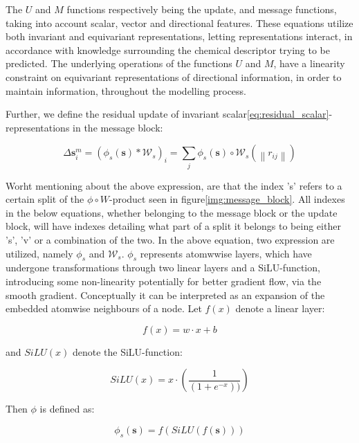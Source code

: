 The $U$ and $M$ functions respectively being the update, and message functions, taking into account scalar, vector and
directional features. These equations utilize both invariant and equivariant representations, letting
representations interact, in accordance with knowledge surrounding the chemical descriptor trying to be predicted. The underlying
operations of the functions $U$ and $M$, have a linearity constraint on equivariant representations of directional information,
in order to maintain
information, throughout the modelling process\cite{Atz2021}.

Further, we define the residual update of invariant scalar\ref{eq:residual_scalar}-representations in the message block:

\begin{equation}\label{eq:residual_scalar}
    \Delta \mathbf{s}_{i}^{m}= (\phi_{s}(\mathbf{s}) * \mathcal{W}_{s})_{i} = \sum_{j} \phi_{s}(\mathbf{s}) \circ \mathcal{W}_{s} \left ( \left \| r_{ij} \right \| \right )
\end{equation}

Worht mentioning about the above expression, are that the index 's' refers to a certain split of the $\phi \circ W$-product seen
in figure\ref{img:message_block}. All indexes in the below equations, whether belonging to the message block or the update block,
will have indexes detailing what part of a split it belongs to being either 's', 'v' or a combination of the two.
In the above equation, two expression are utilized, namely $\phi_{s}$ and $\mathcal{W}_{s}$.
$\phi_{s}$ represents atomwwise layers, which have undergone transformations through two linear layers and a SiLU-function,
introducing some non-linearity potentially for better gradient flow, via the smooth gradient. Conceptually it can be interpreted as an
expansion of the embedded atomwise neighbours of a node.
Let $f(x)$ denote a linear layer:

\begin{equation}\label{eq:linear_layer}
    f(x) = w \cdot x + b
\end{equation}

and $SiLU(x)$ denote the SiLU-function:

\begin{equation}\label{eq:SiLU}
    SiLU(x) = x \cdot \left (  \frac{1}{(1+e^{-x}))}\right )
\end{equation}

Then $\phi$ is defined as:

\begin{equation}
    \phi_{s}(\mathbf{s}) = f(SiLU(f(\mathbf{s})))
\end{equation}

